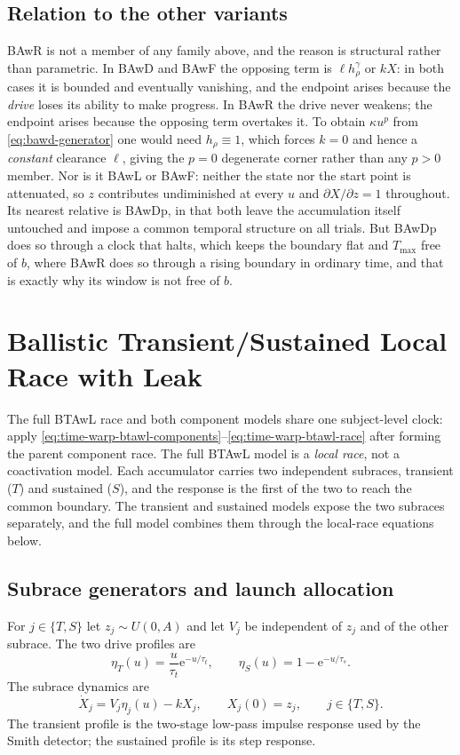 \documentclass[12pt]{article}
\newcommand{\e}{\mathrm{e}}
\theoremstyle{remark}
\begin{document}
\subsection{Relation to the other variants}
BAwR is not a member of any family above, and the reason is structural rather than parametric. In BAwD and BAwF the opposing term is $\ell h_\rho^\gamma$ or $kX$: in both cases it is bounded and eventually vanishing, and the endpoint arises because the \emph{drive} loses its ability to make progress. In BAwR the drive never weakens; the endpoint arises because the opposing term overtakes it. To obtain $\kappa u^p$ from \eqref{eq:bawd-generator} one would need $h_\rho\equiv1$, which forces $k=0$ and hence a \emph{constant} clearance $\ell$, giving the $p=0$ degenerate corner rather than any $p>0$ member. Nor is it BAwL or BAwF: neither the state nor the start point is attenuated, so $z$ contributes undiminished at every $u$ and $\partial X/\partial z=1$ throughout. Its nearest relative is BAwDp, in that both leave the accumulation itself untouched and impose a common temporal structure on all trials. But BAwDp does so through a clock that halts, which keeps the boundary flat and $T_{\max}$ free of $b$, where BAwR does so through a rising boundary in ordinary time, and that is exactly why its window is not free of $b$.

\section{Ballistic Transient/Sustained Local Race with Leak}
\label{sec:btawl}
The full BTAwL race and both component models share one subject-level clock: apply \eqref{eq:time-warp-btawl-components}--\eqref{eq:time-warp-btawl-race} after forming the parent component race. The full BTAwL model is a \emph{local race}, not a coactivation model.  Each accumulator carries two independent subraces, transient ($T$) and sustained ($S$), and the response is the first of the two to reach the common boundary.  The transient and sustained models expose the two subraces separately, and the full model combines them through the local-race equations below.

\subsection{Subrace generators and launch allocation}
\label{sec:btawl-origin}
For $j\in\{T,S\}$ let $z_j\sim U(0,A)$ and let $V_j$ be independent of $z_j$ and of the other subrace.  The two drive profiles are
\begin{equation}
  \eta_T(u)=\frac{u}{\tau_t}\e^{-u/\tau_t},
  \qquad
  \eta_S(u)=1-\e^{-u/\tau_s}.
  \label{eq:btawl-profiles}
\end{equation}
The subrace dynamics are
\begin{equation}
  \dot X_j=V_j\eta_j(u)-kX_j,
  \qquad X_j(0)=z_j,
  \qquad j\in\{T,S\}.
  \label{eq:btawl-local-generator}
\end{equation}
The transient profile is the two-stage low-pass impulse response used by the Smith detector; the sustained profile is its step response.
\end{document}
